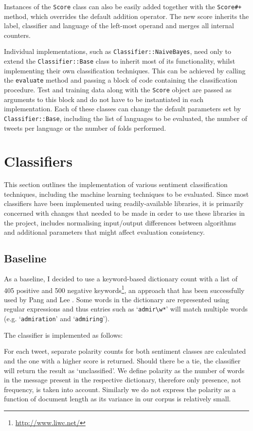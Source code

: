 Instances of the \verb|Score| class can also be easily added together with the \verb|Score#+| method, which overrides the default addition operator. The new score inherits the label, classifier and language of the left-most operand and merges all internal counters.

Individual implementations, such as \verb|Classifier::NaiveBayes|, need only to extend the \verb|Classifier::Base| class to inherit most of its functionality, whilst implementing their own classification techniques. This can be achieved by calling the \verb|evaluate| method and passing a block of code containing the classification procedure. Test and training data along with the \verb|Score| object are passed as arguments to this block and do not have to be instantiated in each implementation. Each of these classes can change the default parameters set by \verb|Classifier::Base|, including the list of languages to be evaluated, the number of tweets per language or the number of folds performed.

\section{Classifiers}

This section outlines the implementation of various sentiment classification techniques, including the machine learning techniques to be evaluated. Since most classifiers have been implemented using readily-available libraries, it is primarily concerned with changes that needed to be made in order to use these libraries in the project, includes normalising input/output differences between algorithms and additional parameters that might affect evaluation consistency.

\subsection{Baseline}

As a baseline, I decided to use a keyword-based dictionary count with a list of 405 positive and 500 negative keywords\footnote{\url{http://www.liwc.net/}}, an approach that has been successfully used by Pang and Lee \cite{PangAndLee}. Some words in the dictionary are represented using regular expressions and thus entries such as `\verb|admir\w*|' will match multiple words (e.g. `\verb|admiration|' and `\verb|admiring|').

The classifier is implemented as follows:

For each tweet, separate polarity counts for both sentiment classes are calculated and the one with a higher score is returned. Should there be a tie, the classifier will return the result as `unclassified'. We define polarity as the number of words in the message present in the respective dictionary, therefore only presence, not frequency, is taken into account. Similarly we do not express the polarity as a function of document length as its variance in our corpus is relatively small.

